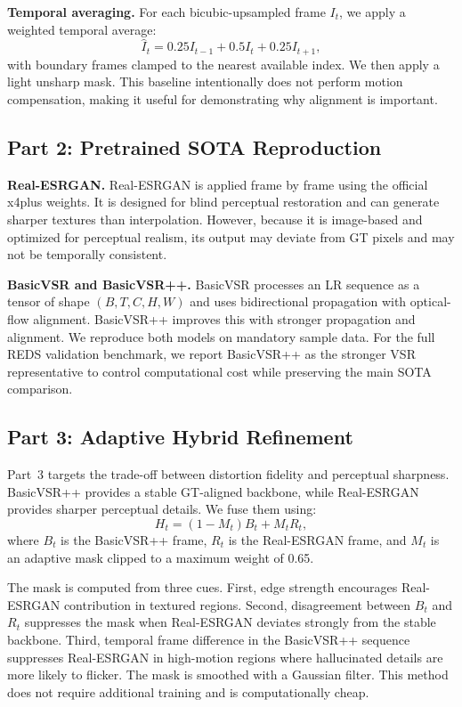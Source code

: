 \documentclass[10pt,twocolumn,letterpaper]{article}
\begin{document}
\textbf{Temporal averaging.}
For each bicubic-upsampled frame $I_t$, we apply a weighted temporal average:
\begin{equation}
\hat{I}_t = 0.25 I_{t-1} + 0.5 I_t + 0.25 I_{t+1},
\end{equation}
with boundary frames clamped to the nearest available index. We then apply a light unsharp mask. This baseline intentionally does not perform motion compensation, making it useful for demonstrating why alignment is important.

\subsection{Part 2: Pretrained SOTA Reproduction}
\textbf{Real-ESRGAN.}
Real-ESRGAN is applied frame by frame using the official x4plus weights. It is designed for blind perceptual restoration and can generate sharper textures than interpolation. However, because it is image-based and optimized for perceptual realism, its output may deviate from GT pixels and may not be temporally consistent.

\textbf{BasicVSR and BasicVSR++.}
BasicVSR processes an LR sequence as a tensor of shape $(B,T,C,H,W)$ and uses bidirectional propagation with optical-flow alignment. BasicVSR++ improves this with stronger propagation and alignment. We reproduce both models on mandatory sample data. For the full REDS validation benchmark, we report BasicVSR++ as the stronger VSR representative to control computational cost while preserving the main SOTA comparison.

\subsection{Part 3: Adaptive Hybrid Refinement}
Part~3 targets the trade-off between distortion fidelity and perceptual sharpness. BasicVSR++ provides a stable GT-aligned backbone, while Real-ESRGAN provides sharper perceptual details. We fuse them using:
\begin{equation}
H_t = (1 - M_t)B_t + M_tR_t,
\end{equation}
where $B_t$ is the BasicVSR++ frame, $R_t$ is the Real-ESRGAN frame, and $M_t$ is an adaptive mask clipped to a maximum weight of 0.65.

The mask is computed from three cues. First, edge strength encourages Real-ESRGAN contribution in textured regions. Second, disagreement between $B_t$ and $R_t$ suppresses the mask when Real-ESRGAN deviates strongly from the stable backbone. Third, temporal frame difference in the BasicVSR++ sequence suppresses Real-ESRGAN in high-motion regions where hallucinated details are more likely to flicker. The mask is smoothed with a Gaussian filter. This method does not require additional training and is computationally cheap.
\end{document}
